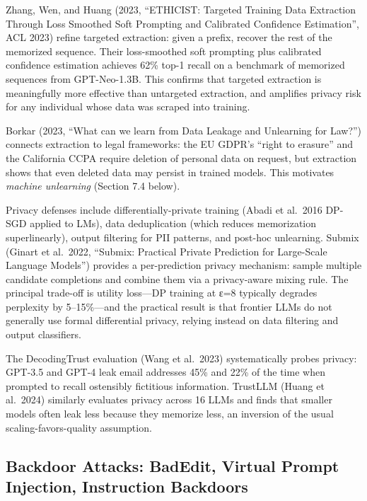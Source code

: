 Zhang, Wen, and Huang (2023, ``ETHICIST: Targeted Training Data Extraction Through Loss Smoothed Soft Prompting and Calibrated Confidence Estimation'', ACL 2023) refine targeted extraction: given a prefix, recover the rest of the memorized sequence. Their loss-smoothed soft prompting plus calibrated confidence estimation achieves 62\% top-1 recall on a benchmark of memorized sequences from GPT-Neo-1.3B. This confirms that targeted extraction is meaningfully more effective than untargeted extraction, and amplifies privacy risk for any individual whose data was scraped into training.

Borkar (2023, ``What can we learn from Data Leakage and Unlearning for Law?'') connects extraction to legal frameworks: the EU GDPR's ``right to erasure'' and the California CCPA require deletion of personal data on request, but extraction shows that even deleted data may persist in trained models. This motivates \emph{machine unlearning} (Section 7.4 below).

Privacy defenses include differentially-private training (Abadi et al.~2016 DP-SGD applied to LMs), data deduplication (which reduces memorization superlinearly), output filtering for PII patterns, and post-hoc unlearning. Submix (Ginart et al.~2022, ``Submix: Practical Private Prediction for Large-Scale Language Models'') provides a per-prediction privacy mechanism: sample multiple candidate completions and combine them via a privacy-aware mixing rule. The principal trade-off is utility loss---DP training at ε=8 typically degrades perplexity by 5--15\%---and the practical result is that frontier LLMs do not generally use formal differential privacy, relying instead on data filtering and output classifiers.

The DecodingTrust evaluation (Wang et al.~2023) systematically probes privacy: GPT-3.5 and GPT-4 leak email addresses 45\% and 22\% of the time when prompted to recall ostensibly fictitious information. TrustLLM (Huang et al.~2024) similarly evaluates privacy across 16 LLMs and finds that smaller models often leak less because they memorize less, an inversion of the usual scaling-favors-quality assumption.

\subsection{Backdoor Attacks: BadEdit, Virtual Prompt Injection, Instruction Backdoors}\label{backdoor-attacks-badedit-virtual-prompt-injection-instruction-backdoors}

